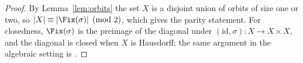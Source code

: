 \begin{proof}
By Lemma~\ref{lem:orbits} the set $X$ is a disjoint union of orbits of size one or two, so $|X| \equiv |\Fix(\sigma)| \pmod 2$, which gives the parity statement. For closedness, $\Fix(\sigma)$ is the preimage of the diagonal under $(\mathrm{id},\sigma)\colon X\to X\times X$, and the diagonal is closed when $X$ is Hausdorff; the same argument in the algebraic setting is \cite[Proposition 3.2]{Man12}.
\end{proof}
